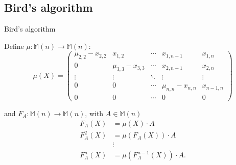\documentclass{beamer}
\begin{document}
\subsection{Bird's algorithm}

\begin{frame}{Bird's algorithm}

    Define $\mu : \mathbb{M}(n) \to \mathbb{M}(n)$:
    \[
        \mu(X) =
        \begin{pmatrix}{}
            \mu_{2,2} - x_{2,2} & x_{1,2}             & \cdots & x_{1,n-1}           & x_{1,n} \\
            0                   & \mu_{3,3} - x_{3,3} & \cdots & x_{2,n-1}           & x_{2,n} \\
            \vdots              & \vdots              & \ddots & \vdots              & \vdots \\
            0                   & 0                   & \cdots & \mu_{n,n} - x_{n,n} & x_{n-1,n} \\
            0                   & 0                   & \cdots & 0                   & 0
        \end{pmatrix}
    \]

    \pause{}

    and $F_A : \mathbb{M}(n) \to \mathbb{M}(n)$,
    with $A \in \mathbb{M}(n)$
    \begin{align*}{}
        F_A(X)    & = \mu(X)\cdot A \\
        F_A^2(X)  & = \mu(F_A(X)) \cdot A \\
                  & \vdots \\
        F_A^n(X)  & = \mu(F_A^{n-1}(X)) \cdot A. \\
    \end{align*}

\end{frame}
\end{document}
